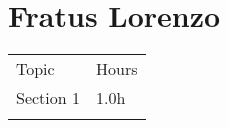\section{Fratus Lorenzo}

\begin{longtable}[]{@{}
  >{\raggedright\arraybackslash}p{}
  >{\raggedleft\arraybackslash}p{}@{}}
\toprule
Topic & Hours \\ \addlinespace
\midrule
\endhead
Section 1 & 1.0h \\ \addlinespace
\bottomrule
\end{longtable}

